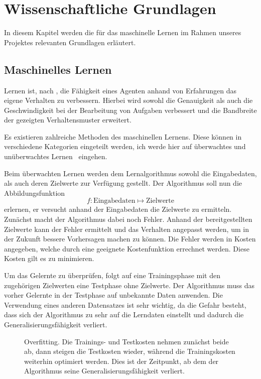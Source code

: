 \chapter{Wissenschaftliche Grundlagen} 

In diesem Kapitel werden die für das maschinelle Lernen im Rahmen unseres Projektes relevanten Grundlagen erläutert.

\section{Maschinelles Lernen}

Lernen ist, nach \citet[]{poole-artificial-intelligence}, die Fähigkeit eines Agenten anhand von Erfahrungen das eigene Verhalten zu verbessern. Hierbei wird sowohl die Genauigkeit als auch die Geschwindigkeit bei der Bearbeitung von Aufgaben verbessert und die Bandbreite der gezeigten Verhaltensmuster erweitert.

Es existieren zahlreiche Methoden des maschinellen Lernens. Diese können in verschiedene Kategorien eingeteilt werden, ich werde hier auf überwachtes und unüberwachtes Lernen~\cite{web:supunsup} eingehen.

Beim überwachten Lernen werden dem Lernalgorithmus sowohl die Eingabedaten, als auch deren Zielwerte zur Verfügung gestellt. Der Algorithmus soll nun die Abbildungsfunktion
$$f: \text{Eingabedaten} \mapsto \text{Zielwerte}$$
erlernen, er versucht anhand der Eingabedaten die Zielwerte zu ermitteln. Zunächst macht der Algorithmus dabei noch Fehler. Anhand der bereitgestellten Zielwerte kann der Fehler ermittelt und das Verhalten angepasst werden, um in der Zukunft bessere Vorhersagen machen zu können. Die Fehler werden in Kosten angegeben, welche durch eine geeignete Kostenfunktion errechnet werden. Diese Kosten gilt es zu minimieren.

Um das Gelernte zu überprüfen, folgt auf eine Trainingsphase mit den zugehörigen Zielwerten eine Testphase ohne Zielwerte. Der Algorithmus muss das vorher Gelernte in der Testphase auf unbekannte Daten anwenden. Die Verwendung eines anderen Datensatzes ist sehr wichtig, da die Gefahr besteht, dass sich der Algorithmus zu sehr auf die Lerndaten einstellt und dadurch die Generalisierungsfähigkeit verliert.

\begin{figure}
    \centering
    
    \caption[Overfitting]{Overfitting. Die Trainings- und Testkosten nehmen zunächst beide ab, dann steigen die Testkosten wieder, während die Trainingskosten weiterhin optimiert werden. Dies ist der Zeitpunkt, ab dem der Algorithmus seine Generalisierungsfähigkeit verliert.}
\end{figure}


